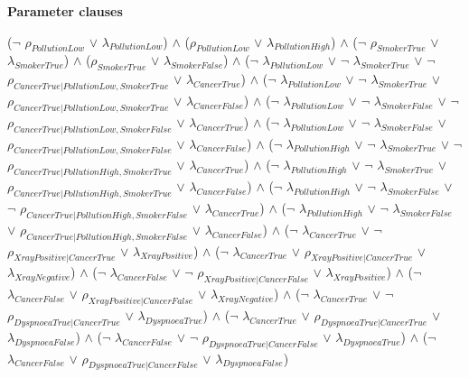 \documentclass[a4paper,10pt]{report}
\begin{document}
\textbf{Parameter clauses}
\begin{center}
($\neg$ $\rho_{PollutionLow}$ $\lor$ $\lambda_{PollutionLow}$) $\land$ 
 ($\rho_{PollutionLow}$ $\lor$ $\lambda_{PollutionHigh}$) $\land$ 
 ($\neg$ $\rho_{SmokerTrue}$ $\lor$ $\lambda_{SmokerTrue}$) $\land$ 
 ($\rho_{SmokerTrue}$ $\lor$ $\lambda_{SmokerFalse}$) $\land$ 
 ($\neg$ $\lambda_{PollutionLow}$ $\lor$ $\neg$ $\lambda_{SmokerTrue}$ $\lor$ $\neg$ $\rho_{CancerTrue|PollutionLow,SmokerTrue}$ $\lor$ $\lambda_{CancerTrue}$) $\land$ 
 ($\neg$ $\lambda_{PollutionLow}$ $\lor$ $\neg$ $\lambda_{SmokerTrue}$ $\lor$ $\rho_{CancerTrue|PollutionLow,SmokerTrue}$ $\lor$ $\lambda_{CancerFalse}$) $\land$ 
 ($\neg$ $\lambda_{PollutionLow}$ $\lor$ $\neg$ $\lambda_{SmokerFalse}$ $\lor$ $\neg$ $\rho_{CancerTrue|PollutionLow,SmokerFalse}$ $\lor$ $\lambda_{CancerTrue}$) $\land$ 
 ($\neg$ $\lambda_{PollutionLow}$ $\lor$ $\neg$ $\lambda_{SmokerFalse}$ $\lor$ $\rho_{CancerTrue|PollutionLow,SmokerFalse}$ $\lor$ $\lambda_{CancerFalse}$) $\land$ 
 ($\neg$ $\lambda_{PollutionHigh}$ $\lor$ $\neg$ $\lambda_{SmokerTrue}$ $\lor$ $\neg$ $\rho_{CancerTrue|PollutionHigh,SmokerTrue}$ $\lor$ $\lambda_{CancerTrue}$) $\land$ 
 ($\neg$ $\lambda_{PollutionHigh}$ $\lor$ $\neg$ $\lambda_{SmokerTrue}$ $\lor$ $\rho_{CancerTrue|PollutionHigh,SmokerTrue}$ $\lor$ $\lambda_{CancerFalse}$) $\land$ 
 ($\neg$ $\lambda_{PollutionHigh}$ $\lor$ $\neg$ $\lambda_{SmokerFalse}$ $\lor$ $\neg$ $\rho_{CancerTrue|PollutionHigh,SmokerFalse}$ $\lor$ $\lambda_{CancerTrue}$) $\land$ 
 ($\neg$ $\lambda_{PollutionHigh}$ $\lor$ $\neg$ $\lambda_{SmokerFalse}$ $\lor$ $\rho_{CancerTrue|PollutionHigh,SmokerFalse}$ $\lor$ $\lambda_{CancerFalse}$) $\land$ 
 ($\neg$ $\lambda_{CancerTrue}$ $\lor$ $\neg$ $\rho_{XrayPositive|CancerTrue}$ $\lor$ $\lambda_{XrayPositive}$) $\land$ 
 ($\neg$ $\lambda_{CancerTrue}$ $\lor$ $\rho_{XrayPositive|CancerTrue}$ $\lor$ $\lambda_{XrayNegative}$) $\land$ 
 ($\neg$ $\lambda_{CancerFalse}$ $\lor$ $\neg$ $\rho_{XrayPositive|CancerFalse}$ $\lor$ $\lambda_{XrayPositive}$) $\land$ 
 ($\neg$ $\lambda_{CancerFalse}$ $\lor$ $\rho_{XrayPositive|CancerFalse}$ $\lor$ $\lambda_{XrayNegative}$) $\land$ 
 ($\neg$ $\lambda_{CancerTrue}$ $\lor$ $\neg$ $\rho_{DyspnoeaTrue|CancerTrue}$ $\lor$ $\lambda_{DyspnoeaTrue}$) $\land$ 
 ($\neg$ $\lambda_{CancerTrue}$ $\lor$ $\rho_{DyspnoeaTrue|CancerTrue}$ $\lor$ $\lambda_{DyspnoeaFalse}$) $\land$ 
 ($\neg$ $\lambda_{CancerFalse}$ $\lor$ $\neg$ $\rho_{DyspnoeaTrue|CancerFalse}$ $\lor$ $\lambda_{DyspnoeaTrue}$) $\land$ 
 ($\neg$ $\lambda_{CancerFalse}$ $\lor$ $\rho_{DyspnoeaTrue|CancerFalse}$ $\lor$ $\lambda_{DyspnoeaFalse}$)
\end{center}
\end{document}
